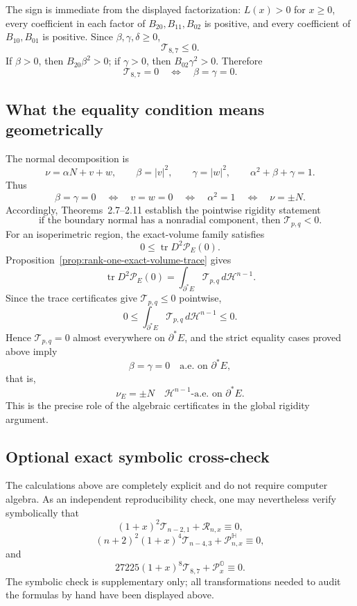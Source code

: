 \documentclass[11pt,reqno]{amsart}
\numberwithin{equation}{section}
\theoremstyle{definition}
\theoremstyle{remark}
\begin{document}
The sign is immediate from the displayed factorization: $L(x)>0$ for
$x\ge0$, every coefficient in each factor of $B_{20},B_{11},B_{02}$ is
positive, and every coefficient of $B_{10},B_{01}$ is positive.  Since
$\beta,\gamma,\delta\ge0$,
\[
\mathscr T_{8,7}\le0.
\]
If $\beta>0$, then $B_{20}\beta^2>0$; if $\gamma>0$, then
$B_{02}\gamma^2>0$.  Therefore
\[
\mathscr T_{8,7}=0
\quad\Longleftrightarrow\quad
\beta=\gamma=0.
\]

\subsection{What the equality condition means geometrically}

The normal decomposition is
\[
\nu=\alpha N+v+w,
\qquad
\beta=|v|^2,
\qquad
\gamma=|w|^2,
\qquad
\alpha^2+\beta+\gamma=1.
\]
Thus
\[
\beta=\gamma=0
\quad\Longleftrightarrow\quad
v=w=0
\quad\Longleftrightarrow\quad
\alpha^2=1
\quad\Longleftrightarrow\quad
\nu=\pm N.
\]
Accordingly, Theorems~2.7--2.11 establish the pointwise rigidity statement
\[
\text{if the boundary normal has a nonradial component, then }
\mathscr T_{p,q}<0.
\]
For an isoperimetric region, the exact-volume family satisfies
\[
0\le\operatorname{tr}D^2\mathscr P_E(0).
\]
Proposition~\ref{prop:rank-one-exact-volume-trace} gives
\[
\operatorname{tr}D^2\mathscr P_E(0)
=\int_{\partial^*E}\mathscr T_{p,q}\,d\mathcal H^{n-1}.
\]
Since the trace certificates give $\mathscr T_{p,q}\le0$ pointwise,
\[
0
\le
\int_{\partial^*E}\mathscr T_{p,q}\,d\mathcal H^{n-1}
\le0.
\]
Hence $\mathscr T_{p,q}=0$ almost everywhere on $\partial^*E$, and the strict
equality cases proved above imply
\[
\beta=\gamma=0
\quad\text{a.e. on }\partial^*E,
\]
that is,
\[
\nu_E=\pm N
\quad\mathcal H^{n-1}\text{-a.e. on }\partial^*E.
\]
This is the precise role of the algebraic certificates in the global rigidity
argument.

\subsection{Optional exact symbolic cross-check}

The calculations above are completely explicit and do not require computer
algebra.  As an independent reproducibility check, one may nevertheless verify
symbolically that
\[
(1+x)^2\mathscr T_{n-2,1}+\mathcal R_{n,x}\equiv0,
\]
\[
(n+2)^2(1+x)^4\mathscr T_{n-4,3}
+\mathcal P^{\mathbb H}_{n,x}\equiv0,
\]
and
\[
27225(1+x)^8\mathscr T_{8,7}
+\mathcal P^{\mathbb O}_{x}\equiv0.
\]
The symbolic check is supplementary only; all transformations needed to audit
the formulas by hand have been displayed above.
\end{document}
